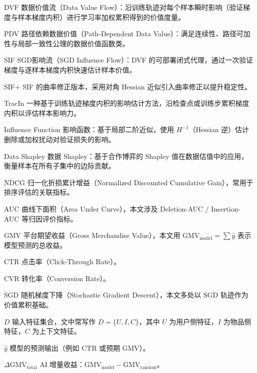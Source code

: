 \begin{denotation}[3cm]
  \item[DVF] 数据价值流（Data Value Flow）：沿训练轨迹对每个样本瞬时影响（验证梯度与样本梯度内积）进行学习率加权累积得到的价值度量。
  \item[PDV] 路径依赖数据价值（Path-Dependent Data Value）：满足连续性、路径可加性与局部一致性公理的数据价值函数类。
  \item[SIF] SGD影响流（SGD Influence Flow）：DVF 的可部署闭式代理，通过一次验证梯度与逐样本梯度内积快速估计样本价值。
  \item[SIF+] SIF 的曲率修正版本，采用对角 Hessian 近似引入曲率修正以提升稳定性。
  \item[TracIn] 一种基于训练轨迹梯度内积的影响估计方法，沿检查点或训练步累积梯度内积以评估样本影响力。
  \item[Influence Function] 影响函数：基于局部二阶近似，使用 $H^{-1}$（Hessian 逆）估计删除或加权扰动对验证损失的影响。
  \item[Data Shapley] 数据 Shapley：基于合作博弈的 Shapley 值在数据估值中的应用，衡量样本在所有子集中的边际贡献。
  \item[NDCG] 归一化折损累计增益（Normalized Discounted Cumulative Gain），常用于排序评估的关联指标。
  \item[AUC] 曲线下面积（Area Under Curve），本文涉及 Deletion-AUC / Insertion-AUC 等归因评价指标。
  \item[GMV] 平台期望收益（Gross Merchandise Value），本文用 $\mathrm{GMV}_{\mathrm{model}}=\sum \hat{y}$ 表示模型预测的总收益。
  \item[CTR] 点击率（Click-Through Rate）。
  \item[CVR] 转化率（Conversion Rate）。
  \item[SGD] 随机梯度下降（Stochastic Gradient Descent），本文多处以 SGD 轨迹作为价值累积基础。
  \item[$D$] 输入特征集合，文中常写作 $D=\{U,I,C\}$，其中 $U$ 为用户侧特征，$I$ 为物品侧特征，$C$ 为上下文特征。
  \item[$\hat{y}$] 模型的预测输出（例如 CTR 或预期 GMV）。
  \item[$\Delta\mathrm{GMV}_{\mathrm{total}}$] AI 增量收益：$\mathrm{GMV}_{\mathrm{model}}-\mathrm{GMV}_{\mathrm{random}}$。
\end{denotation}



